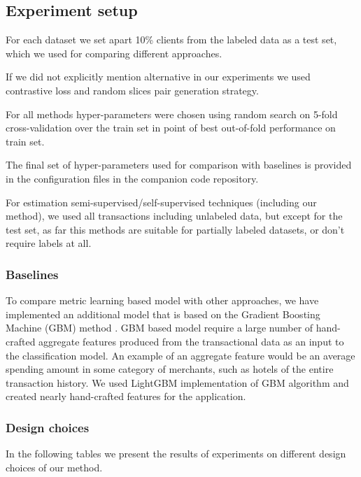 \documentclass[sigconf]{acmart}
\begin{document}
\subsection{Experiment setup}

For each dataset we set apart 10\% clients from the labeled data as a test set, which we used for comparing different approaches.

If we did not explicitly mention alternative in our experiments we used contrastive loss and random slices pair generation strategy.

For all methods hyper-parameters were chosen using random search on 5-fold cross-validation over the train set in point of best out-of-fold performance on train set.


 The final set of hyper-parameters used for comparison with baselines is provided in the configuration files in the companion code repository.

For estimation semi-supervised/self-supervised techniques (including our method), we used all transactions including unlabeled data, but except for the test set, as far this methods are suitable for partially labeled datasets, or don't require labels at all.

\subsubsection{Baselines} \label{sec-baselines}

To compare metric learning based model with other approaches, we have implemented an
additional model that is based on the Gradient Boosting Machine
(GBM) method \cite{friedman2001}.
GBM based model require a large number of hand-crafted aggregate features produced from the transactional data as an input to the classification model. An example
of an aggregate feature would be an average spending amount in
some category of merchants, such as hotels of the entire transaction
history.
We used LightGBM\cite{NIPS2017_6907} implementation of GBM algorithm and
created nearly  hand-crafted features for the application.

\subsubsection{Design choices}

In the following tables we present the results of experiments on different design choices of our method.
\end{document}
